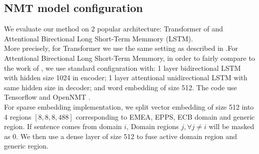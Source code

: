 \documentclass[11pt,a4paper]{article}
\begin{document}
\begin{table}[H]
\caption{Corpora}
\label{table:Corpora}
\end{table}
\subsection{NMT model configuration}
We evaluate our method on 2 popular architecture: Transformer of and Attentional Birectional Long Short-Term Memmory (LSTM).\\
More precisely, for Transformer we use the same setting as described in \cite{NIPS2017_7181}.For Attentional Birectional Long Short-Term Memmory, in order to fairly compare to the work of \cite{D18-1041}, we use standard configuration with: 1 layer bidirectional LSTM with hidden size 1024 in encoder; 1 layer attentional unidirectional LSTM with same hidden size in decoder; and word embedding of size 512. The code use Tensorflow and OpenNMT \cite{P17-4012}.\\
For sparse embedding implementation, we split vector embedding of size 512 into 4 regions $[8,8,8,488]$ corresponding to EMEA, EPPS, ECB domain and generic region. If sentence comes from domain $i$, Domain regions $j,\forall j \neq i$ will be masked as 0. We then use a dense layer of size 512 to fuse active domain region and generic region.
\end{document}
